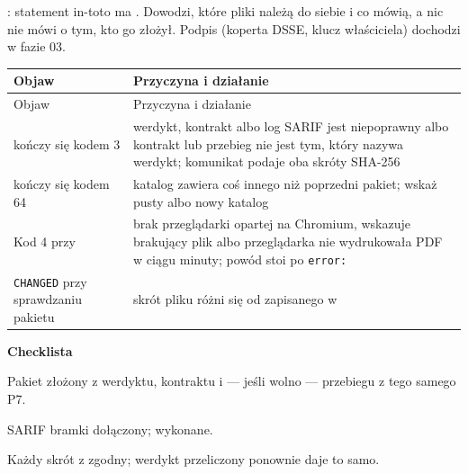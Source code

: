 : statement in-toto ma . Dowodzi, które pliki należą do siebie i co mówią, a nic nie mówi o tym, kto go
złożył. Podpis (koperta DSSE, klucz właściciela) dochodzi w fazie 03.

\begin{xltabular}{\linewidth}{@{}>{\raggedright\arraybackslash}p{5.6cm} >{\raggedright\arraybackslash}X@{}}
\toprule
Objaw & Przyczyna i działanie \\
\midrule
\endfirsthead
\toprule
Objaw & Przyczyna i działanie \\
\midrule
\endhead
{} kończy się kodem 3 & werdykt, kontrakt albo log SARIF jest niepoprawny albo kontrakt lub przebieg nie jest tym, który nazywa werdykt; komunikat podaje oba skróty SHA-256 \\
 kończy się kodem 64 & katalog  zawiera coś innego niż poprzedni pakiet; wskaż pusty albo nowy katalog \\
Kod 4 przy  & brak przeglądarki opartej na Chromium,  wskazuje brakujący plik albo przeglądarka nie wydrukowała PDF w ciągu minuty; powód stoi po \texttt{error:} \\
\texttt{CHANGED} przy sprawdzaniu pakietu & skrót pliku różni się od zapisanego w  \\
\bottomrule
\end{xltabular}

\textbf{Checklista}
\begin{checklista}
  \item Pakiet złożony z werdyktu, kontraktu i --- jeśli wolno --- przebiegu z tego samego P7.
  \item SARIF bramki dołączony;  wykonane.
  \item Każdy skrót z  zgodny; werdykt przeliczony ponownie daje to samo.
\end{checklista}


